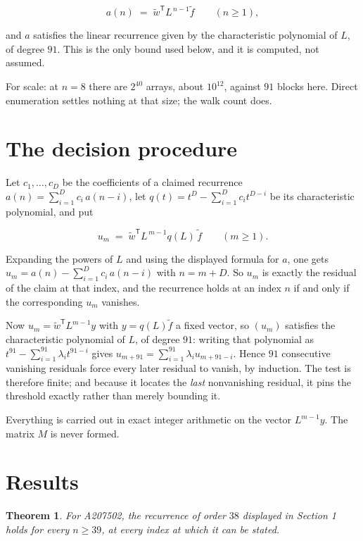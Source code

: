 \documentclass[11pt]{article}
\newtheorem{theorem}{Theorem}
\theoremstyle{definition}
\begin{document}
\[a(n) \;=\; \tilde w^{\mathsf T} L^{\,n-1} \tilde f \qquad (n \ge 1),\]

and $a$ satisfies the linear recurrence given by the characteristic polynomial of $L$, of degree $91$. This is the only bound used below, and it is computed, not assumed.

For scale: at $n = 8$ there are $2^{40}$ arrays, about $10^{12}$, against $91$ blocks here. Direct enumeration settles nothing at that size; the walk count does.

\section{The decision procedure}

Let $c_1,\dots,c_D$ be the coefficients of a claimed recurrence $a(n) = \sum_{i=1}^{D} c_i\,a(n-i)$, let $q(t) = t^{D} - \sum_{i=1}^{D} c_i t^{D-i}$ be its characteristic polynomial, and put

\[u_m \;=\; \tilde w^{\mathsf T} L^{\,m-1} q(L)\,\tilde f \qquad (m \ge 1).\]

Expanding the powers of $L$ and using the displayed formula for $a$, one gets $u_m = a(n) - \sum_{i=1}^{D} c_i\,a(n-i)$ with $n = m + D$. So $u_m$ is exactly the residual of the claim at that index, and the recurrence holds at an index $n$ if and only if the corresponding $u_m$ vanishes.

Now $u_m = \tilde w^{\mathsf T} L^{m-1} y$ with $y = q(L)\tilde f$ a fixed vector, so $(u_m)$ satisfies the characteristic polynomial of $L$, of degree $91$: writing that polynomial as $t^{91} - \sum_{i=1}^{91} \lambda_i t^{91-i}$ gives $u_{m+91} = \sum_{i=1}^{91} \lambda_i u_{m+91-i}$. Hence $91$ consecutive vanishing residuals force every later residual to vanish, by induction. The test is therefore finite; and because it locates the {\itshape last} nonvanishing residual, it pins the threshold exactly rather than merely bounding it.

Everything is carried out in exact integer arithmetic on the vector $L^{m-1}y$. The matrix $M$ is never formed.

\section{Results}

\begin{theorem} For A207502, the recurrence of order $38$ displayed in Section 1 holds for every $n \ge 39$, at every index at which it can be stated.\end{theorem}
\end{document}
